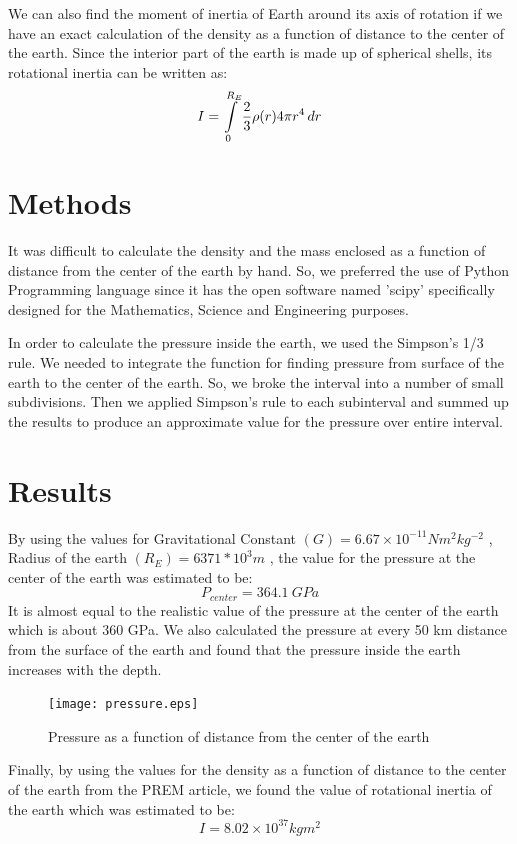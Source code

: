 \documentclass[12pt]{article}
\begin{document}
We can also find the moment of inertia of Earth around its axis of rotation if we have an exact calculation of the density as a function of distance to the center of the earth. Since the interior part of the earth is made up of spherical shells, its rotational inertia can be written as:
\begin{equation}
I=\int\limits_0^{R_E} \\\frac{2}{3}\rho(r)4 \pi r^4 \,dr
\end{equation}

\section{Methods}
It was difficult to calculate the density and the mass enclosed as a function of distance from the center of the earth by hand. So, we preferred the use of Python Programming language since it has the open software named 'scipy' specifically designed for the Mathematics, Science and Engineering purposes.

In order to calculate the pressure inside the earth, we used the Simpson's 1/3 rule. We needed to integrate the function for finding pressure from surface of the earth to the center of the earth. So, we broke the interval into a number of small subdivisions. Then we applied Simpson's rule to each subinterval and summed up the results to produce an approximate value for the pressure over entire interval.


\section{Results}
By using the values for Gravitational Constant $(G)=6.67 \times 10^{-11} Nm^{2}kg^{-2}$ , Radius of the earth $(R_E)=6371*10^3 m$ , the value for the pressure at the center of the earth was estimated to be:
\begin{equation}
P_{center}=364.1 \ GPa
\end{equation}
It is almost equal to the realistic value of the pressure at the center of the earth which is about 360 GPa. We also calculated the pressure at every 50 km distance from the surface of the earth and found that the pressure inside the earth increases with the depth. 
\begin{figure}[H]
\centering
\texttt{[image: pressure.eps]}\caption{Pressure as a function of distance from the center of the earth}
\end{figure}

Finally, by using the values for the density as a function of distance to the center of the earth from the PREM article, we found the value of rotational inertia of the earth which was estimated to be:
\begin{equation}
I=8.02 \times 10^{37} kg m^2
\end{equation}
\end{document}
